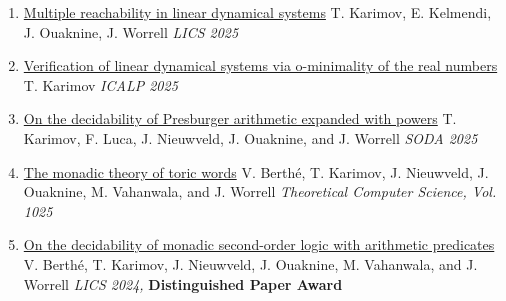 \documentclass{article}
\begin{document}
    \begin{enumerate}
    		\item
    		\href{https://toghrul-karimov.github.io/assets/papers/multiple-reachability.pdf}{\large Multiple reachability in linear dynamical systems}
    		\vspace*{0.2cm}\newline
    		T. Karimov, E. Kelmendi, J. Ouaknine, J. Worrell
    		\vspace*{0.25cm}\newline\emph{LICS 2025}
    		\vspace{0.2cm}
    		
    		\item
    		\href{https://toghrul-karimov.github.io/assets/papers/icalp25.pdf}{\large Verification of linear dynamical systems via o-minimality of the real numbers}
    		\vspace*{0.2cm}\newline
    		T. Karimov
    		\vspace*{0.25cm}\newline\emph{ICALP 2025}
    		\vspace{0.2cm}
    
            \item 
            \href{https://toghrul-karimov.github.io/assets/papers/presburger-235.pdf}{\large On the decidability of Presburger arithmetic expanded with powers}
            \vspace*{0.2cm}\newline
            T. Karimov, F. Luca, J. Nieuwveld, J. Ouaknine, and J. Worrell
		\vspace*{0.25cm}\newline\emph{SODA 2025}
            \vspace{0.2cm}

            \item\href{https://doi.org/10.2016/j.tcs.2024.114959}{\large The monadic theory of toric words}
            \vspace*{0.2cm}\newline
            V. Berth\'e, T. Karimov, J. Nieuwveld, J. Ouaknine, M. Vahanwala, and J. Worrell
		\vspace*{0.25cm}\newline\emph{Theoretical Computer Science, Vol. 1025}
            \vspace*{0.2cm}
  
		\item \href{https://doi.org/10.2145/3661814.3662119}{\large On the decidability of monadic second-order logic with arithmetic predicates}
            \vspace*{0.2cm}
		\newline
            V. Berth\'e, T. Karimov, J. Nieuwveld, J. Ouaknine, M. Vahanwala, and J. Worrell
		\vspace*{0.25cm}\newline\emph{LICS 2024,} \textbf{Distinguished Paper Award} 
		\vspace*{0.2cm}
  

\end{enumerate}
\end{document}
